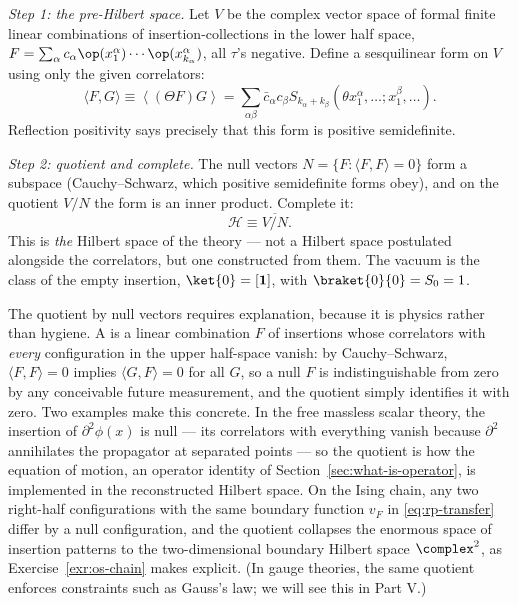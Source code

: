 \emph{Step 1: the pre-Hilbert space.} Let $V$ be the complex vector space of
formal finite linear combinations of insertion-collections in the lower half
space, $F = \sum_\alpha c_\alpha \op(x_1^\alpha)\cdots\op(x^\alpha_{k_\alpha})$,
all $\tau$'s negative. Define a sesquilinear form on $V$ using only the given
correlators:
\begin{equation}
\langle F, G\rangle \equiv \left\langle (\Theta F) G \right\rangle
= \sum_{\alpha\beta} \bar c_\alpha c_\beta
S_{k_\alpha + k_\beta}\left(\theta x^\alpha_1, \dots; x^\beta_1, \dots\right).
\label{eq:os-inner-product}
\end{equation}
Reflection positivity says precisely that this form is positive semidefinite.

\emph{Step 2: quotient and complete.} The null vectors $N = \{F : \langle F,
F\rangle = 0\}$ form a subspace (Cauchy--Schwarz, which positive semidefinite
forms obey), and on the quotient $V/N$ the form is an inner product.
Complete it:
\begin{equation}
\mathcal{H} \equiv \overline{V / N}.
\end{equation}
This is \emph{the} Hilbert space of the theory --- not a Hilbert space
postulated alongside the correlators, but one constructed from them. The
vacuum is the class of the empty insertion, $\ket{0} = [\mathbf{1}]$, with
$\braket{0}{0} = S_0 = 1$.

The quotient by null vectors requires explanation, because it is physics
rather than hygiene. A  is a linear combination $F$
of insertions whose correlators with \emph{every} configuration in the upper
half-space vanish: by Cauchy--Schwarz, $\langle F, F\rangle = 0$ implies
$\langle G, F \rangle = 0$ for all $G$, so a null $F$ is indistinguishable
from zero by any conceivable future measurement, and the quotient simply
identifies it with zero. Two examples make this concrete. In the free
massless scalar theory, the insertion of $\partial^2\phi(x)$ is null --- its
correlators with everything vanish because $\partial^2$ annihilates the
propagator at separated points --- so the quotient is how the equation of
motion, an operator identity of Section~\ref{sec:what-is-operator}, is
implemented in the reconstructed Hilbert space. On the Ising chain, any two
right-half configurations with the same boundary function $v_F$ in
\eqref{eq:rp-transfer} differ by a null configuration, and the quotient
collapses the enormous space of insertion patterns to the two-dimensional
boundary Hilbert space $\complex^2$, as Exercise~\ref{exr:os-chain} makes
explicit. (In gauge theories, the same quotient enforces constraints such as
Gauss's law; we will see this in Part V.)

